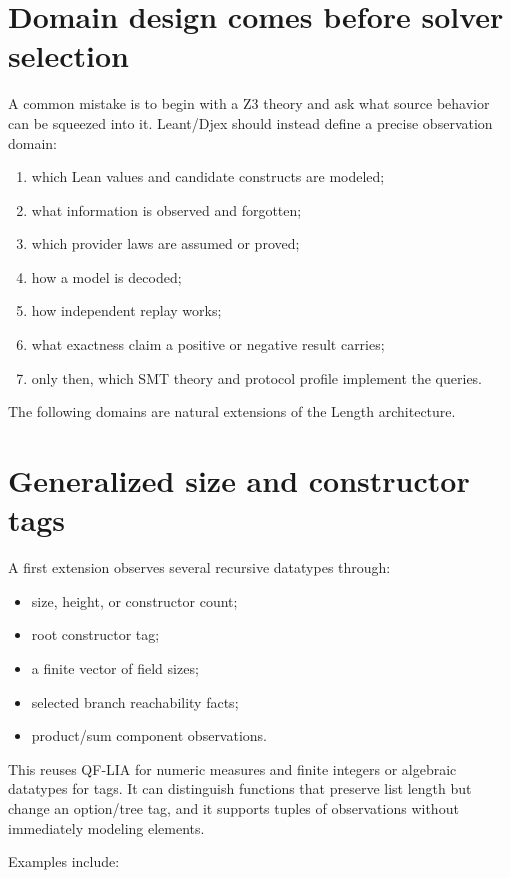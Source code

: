 \documentclass[10pt,letterpaper,oneside]{report}
\begin{document}
\section{Domain design comes before solver selection}

A common mistake is to begin with a Z3 theory and ask what source behavior can be squeezed into it. Leant/Djex should instead define a precise observation domain:

\begin{enumerate}
\item which Lean values and candidate constructs are modeled;
\item what information is observed and forgotten;
\item which provider laws are assumed or proved;
\item how a model is decoded;
\item how independent replay works;
\item what exactness claim a positive or negative result carries;
\item only then, which SMT theory and protocol profile implement the queries.
\end{enumerate}

The following domains are natural extensions of the Length architecture.

\section{Generalized size and constructor tags}

A first extension observes several recursive datatypes through:

\begin{itemize}
\item size, height, or constructor count;
\item root constructor tag;
\item a finite vector of field sizes;
\item selected branch reachability facts;
\item product/sum component observations.
\end{itemize}

This reuses QF-LIA for numeric measures and finite integers or algebraic datatypes for tags. It can distinguish functions that preserve list length but change an option/tree tag, and it supports tuples of observations without immediately modeling elements.

Examples include:
\end{document}
